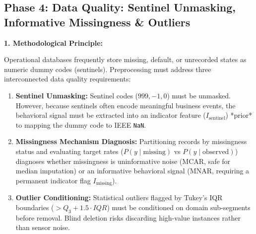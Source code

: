 \documentclass[11pt,a4paper]{article}
\begin{document}
\subsection*{Phase 4: Data Quality: Sentinel Unmasking, Informative Missingness \& Outliers}

\noindent\textbf{1. Methodological Principle:}\par\vspace{0.2em}
Operational databases frequently store missing, default, or unrecorded states as numeric dummy codes (sentinels). Preprocessing must address three interconnected data quality requirements:
\begin{enumerate}[leftmargin=*]
    \item \textbf{Sentinel Unmasking:} Sentinel codes ($999, -1, 0$) must be unmasked. However, because sentinels often encode meaningful business events, the behavioral signal must be extracted into an indicator feature ($I_{\text{sentinel}}$) *prior* to mapping the dummy code to IEEE \lstinline!NaN!.
    \item \textbf{Missingness Mechanism Diagnosis:} Partitioning records by missingness status and evaluating target rates ($P(y \mid \text{missing})$ vs $P(y \mid \text{observed})$) diagnoses whether missingness is uninformative noise (MCAR, safe for median imputation) or an informative behavioral signal (MNAR, requiring a permanent indicator flag $I_{\text{missing}}$).
    \item \textbf{Outlier Conditioning:} Statistical outliers flagged by Tukey's IQR boundaries ($> Q_3 + 1.5 \cdot IQR$) must be conditioned on domain sub-segments before removal. Blind deletion risks discarding high-value instances rather than sensor noise.
\end{enumerate}
\end{document}
